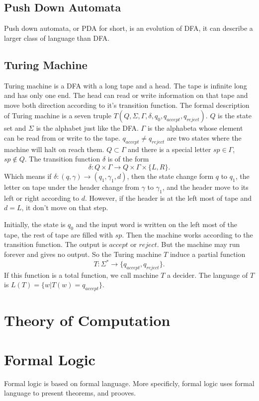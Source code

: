 \documentclass{article}
\begin{document}
\subsection{Push Down Automata}
Push down automata, or PDA for short, is an evolution of
DFA, it can describe a larger class of language than DFA.

\subsection{Turing Machine}
Turing machine is a DFA with a long tape and a head. The tape is infinite long and has only one end.
The head can read or write information on that tape and move both direction
according to it's transition function.
The formal description of Turing machine is a seven truple
$T(Q, \Sigma, \Gamma, \delta, q_0, q_{accept}, q_{reject})$.
$Q$ is the state set and $\Sigma$ is the alphabet just like the DFA.
$\Gamma$ is the alphabeta whose element can be read from or write to the tape.
$q_{accept} \neq q_{reject}$ are two states where the machine will halt on reach them.
$Q \subset \Gamma$ and there is a special letter $sp \in \Gamma$, $sp \notin Q$.
The transition function $\delta$ is of the form
$$\delta : Q \times \Gamma \to Q \times \Gamma \times \{L, R\}.
$$ Which means if $\delta : (q, \gamma) \to (q_1, \gamma_1, d)$,
then the state change form $q$ to $q_1$,
the letter on tape under the header change from $\gamma$ to $\gamma_1$,
and the header move to its left or right according to $d$.
However, if the header is at the left most of tape and $d = L$, it don't move on that step.

Initially, the state is $q_0$ and the input word is written on the left most of the tape,
the rest of tape are filled with $sp$. Then the machine works according to the transition function.
The output is $accept$ or $reject$. But the machine may run forever and gives no output.
So the Turing machine $T$ induce a partial function $$T : \Sigma^\ast \to \{q_{accept}, q_{reject}\}.$$
If this function is a total function, we call machine $T$ a decider.
The language of $T$ is $L(T) = \{w \vert T(w) = q_{accept}\}$.
\section{Theory of Computation}

\section{Formal Logic}
Formal logic is based on formal language.	
More specificly, formal logic uses formal language to present theorems, and prooves.
\end{document}
